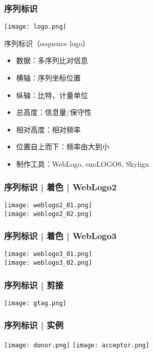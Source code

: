 \begin{frame}
  \frametitle{\alert{序列标识}}
  \begin{center}
    \texttt{[image: logo.png]}
  \end{center}
  \pause
  \begin{block}{序列标识（sequence logo）}
    \begin{itemize}
      \item 数据：多序列比对信息
      \item 横轴：序列坐标位置
      \item 纵轴：比特，计量单位
      \item 总高度：信息量/保守性
      \item 相对高度：相对频率
      \item 位置自上而下：频率由大到小
      \item 制作工具：WebLogo, enoLOGOS, Skylign
    \end{itemize}
  \end{block}
\end{frame}

\begin{frame}
  \frametitle{序列标识 | 着色 | WebLogo2}
  \begin{center}
    \texttt{[image: weblogo2\_01.png]}\\
    \vspace{1em}
    \texttt{[image: weblogo2\_02.png]}
  \end{center}
\end{frame}

\begin{frame}
  \frametitle{序列标识 | 着色 | WebLogo3}
  \begin{center}
    \texttt{[image: weblogo3\_01.png]}\\
    \vspace{1em}
    \texttt{[image: weblogo3\_02.png]}
  \end{center}
\end{frame}

\begin{frame}
  \frametitle{序列标识 | 剪接}
  \begin{center}
    \texttt{[image: gtag.png]}
  \end{center}
\end{frame}

\begin{frame}
  \frametitle{序列标识 | 实例}
  \begin{center}
    \texttt{[image: donor.png]}
    \vspace{0.5cm}
    \texttt{[image: acceptor.png]}
  \end{center}
\end{frame}

